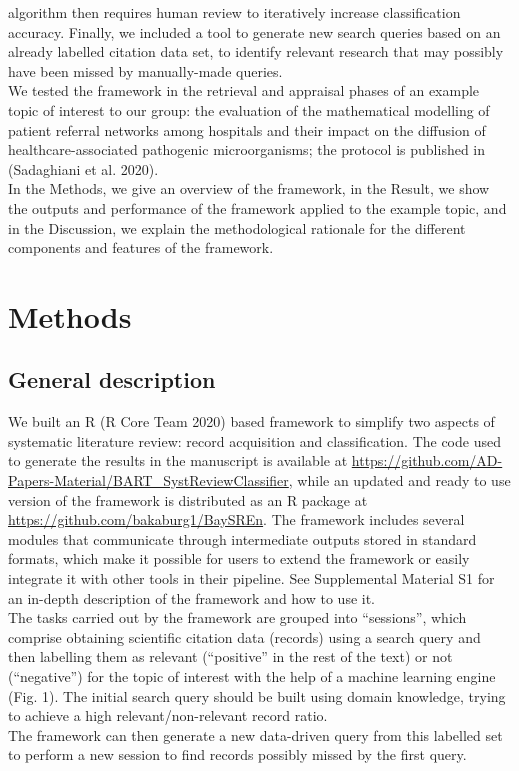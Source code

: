 \documentclass{article}
\begin{document}
algorithm then requires human review to iteratively increase
classification accuracy. Finally, we included a tool to generate new
search queries based on an already labelled citation data set, to
identify relevant research that may possibly have been missed by
manually-made queries.\\
We tested the framework in the retrieval and appraisal phases of an
example topic of interest to our group: the evaluation of the
mathematical modelling of patient referral networks among hospitals and
their impact on the diffusion of healthcare-associated pathogenic
microorganisms; the protocol is published in (Sadaghiani et al. 2020).\\
In the Methods, we give an overview of the framework, in the Result, we
show the outputs and performance of the framework applied to the example
topic, and in the Discussion, we explain the methodological rationale
for the different components and features of the framework.\\

\hypertarget{methods}{%
\section{Methods}\label{methods}}

\hypertarget{general-description}{%
\subsection{General description}\label{general-description}}

We built an R (R Core Team 2020) based framework to simplify two aspects
of systematic literature review: record acquisition and classification.
The code used to generate the results in the manuscript is available at
\url{https://github.com/AD-Papers-Material/BART_SystReviewClassifier},
while an updated and ready to use version of the framework is
distributed as an R package at
\url{https://github.com/bakaburg1/BaySREn}. The framework includes
several modules that communicate through intermediate outputs stored in
standard formats, which make it possible for users to extend the
framework or easily integrate it with other tools in their pipeline. See
Supplemental Material S1 for an in-depth description of the framework
and how to use it.\\
The tasks carried out by the framework are grouped into ``sessions'',
which comprise obtaining scientific citation data (records) using a
search query and then labelling them as relevant (``positive'' in the
rest of the text) or not (``negative'') for the topic of interest with
the help of a machine learning engine (Fig. 1). The initial search query
should be built using domain knowledge, trying to achieve a high
relevant/non-relevant record ratio.\\
The framework can then generate a new data-driven query from this
labelled set to perform a new session to find records possibly missed by
the first query.\\
\end{document}
